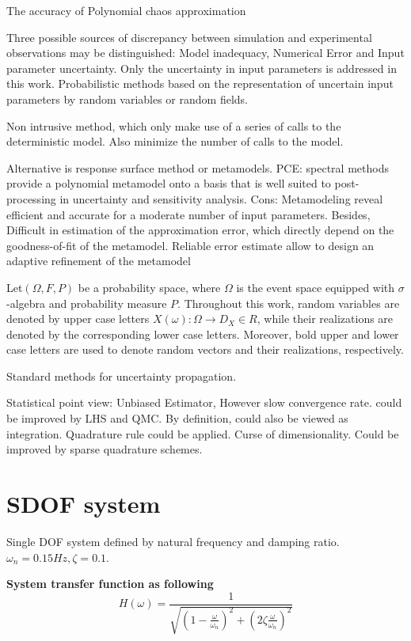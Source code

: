 \documentclass[twocolumn,10pt]{asme2e}
\begin{document}
The accuracy of Polynomial chaos approximation \cite{field2004accuracy}

Three possible sources of discrepancy between simulation and experimental observations may be distinguished: Model inadequacy, Numerical Error and Input parameter uncertainty. Only the uncertainty in input parameters is addressed in this work. Probabilistic methods based on the representation of uncertain input parameters by random variables or random fields.

Non intrusive method, which only make use of a series of calls to the deterministic model. Also minimize the number of calls to the model.

Alternative is response surface method or metamodels. PCE: spectral methods provide a polynomial metamodel onto a basis that is well suited to post-processing in uncertainty and sensitivity analysis. Cons: Metamodeling reveal efficient and accurate for a moderate number of input parameters. Besides, Difficult in estimation of the approximation error, which directly depend on the goodness-of-fit of the metamodel. Reliable error estimate allow to design an adaptive refinement of the metamodel 

Let$ \left( \Omega, F, P \right)$ be a probability space, where $\Omega$ is the event space equipped with $\sigma$-algebra and probability measure $P$. Throughout this work, random variables are denoted by upper case letters $X(\omega): \Omega \to D_{X} \in R$, while their realizations are denoted by the corresponding lower case letters. Moreover, bold upper and lower case letters are used to denote random vectors and their realizations, respectively.

Standard methods for uncertainty propagation.

Statistical point view: Unbiased Estimator, However slow convergence rate. could be improved by LHS and QMC.
By definition, could also be viewed as integration. Quadrature rule could be applied. Curse of dimensionality. Could be improved by sparse quadrature schemes.



\section*{SDOF system}
Single DOF system defined by natural frequency and damping ratio. $\omega_n = 0.15 Hz, \zeta = 0.1$. 

\textbf{System transfer function as following}
\begin{equation*}
  H(\omega) = \frac{1}{\sqrt{(1 - \frac{\omega}{\omega_n})^2 + (2\zeta\frac{\omega}{\omega_n})^2}}
\end{equation*}
\end{document}
